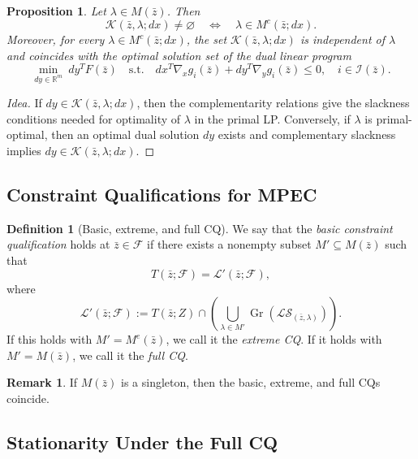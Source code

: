 \documentclass[pdflatex,sn-mathphys-num]{sn-jnl}%
\newtheorem{proposition}[theorem]{Proposition}
\theoremstyle{definition}
\newtheorem{definition}[theorem]{Definition}
\newtheorem{remark}[theorem]{Remark}
\newcommand{\R}{\mathbb{R}}
\newcommand{\Fcal}{\mathcal{F}}
\newcommand{\Lcal}{\mathcal{L}}
\newcommand{\Kcal}{\mathcal{K}}
\newcommand{\Ical}{\mathcal{I}}
\newcommand{\Gr}{\operatorname{Gr}}
\begin{document}
\begin{proposition}
\label{prop:323}
Let $\lambda\in M(\bar z)$. Then
\[
\Kcal(\bar z,\lambda;dx)\neq \varnothing
\quad\Longleftrightarrow\quad
\lambda\in M^c(\bar z;dx).
\]
Moreover, for every $\lambda\in M^c(\bar z;dx)$, the set
$\Kcal(\bar z,\lambda;dx)$ is independent of $\lambda$ and coincides with
the optimal solution set of the dual linear program
\[
\min_{dy\in\R^m}\ dy^T F(\bar z)
\quad\text{s.t.}\quad
dx^T\nabla_x g_i(\bar z)+dy^T\nabla_y g_i(\bar z)\le 0,
\quad i\in \Ical(\bar z).
\]
\end{proposition}

\begin{proof}[Idea]
If $dy\in\Kcal(\bar z,\lambda;dx)$, then the complementarity relations give
the slackness conditions needed for optimality of $\lambda$ in the primal
LP. Conversely, if $\lambda$ is primal-optimal, then an optimal dual
solution $dy$ exists and complementary slackness implies
$dy\in \Kcal(\bar z,\lambda;dx)$.
\end{proof}

\subsection{Constraint Qualifications for MPEC}

\begin{definition}[Basic, extreme, and full CQ]
We say that the \emph{basic constraint qualification} holds at
$\bar z\in\Fcal$ if there exists a nonempty subset $M'\subseteq M(\bar z)$
such that
\[
T(\bar z;\Fcal)=\Lcal'(\bar z;\Fcal),
\]
where
\[
\Lcal'(\bar z;\Fcal):=
T(\bar z;Z)\cap
\left(
\bigcup_{\lambda\in M'}
\Gr(\mathscr{L}\mathscr{S}_{(\bar z,\lambda)})
\right).
\]
If this holds with $M'=M^e(\bar z)$, we call it the \emph{extreme CQ}. If
it holds with $M'=M(\bar z)$, we call it the \emph{full CQ}.
\end{definition}

\begin{remark}
If $M(\bar z)$ is a singleton, then the basic, extreme, and full CQs
coincide.
\end{remark}

\subsection{Stationarity Under the Full CQ}
\end{document}
